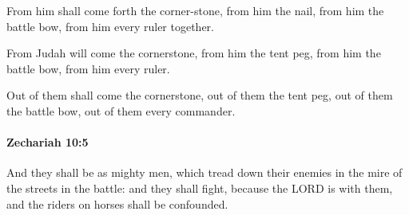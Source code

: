 			\begin{versebox}
					\item[BHS] 
					\item[LXX] 
					\item[ASV] From him shall come forth the corner-stone, from him the nail, from him the battle bow, from him every ruler together.
					\item[NIV] From Judah will come the cornerstone, from him the tent peg, from him the battle bow, from him every ruler.
					\item[NRSV] Out of them shall come the cornerstone, out of them the tent peg, out of them the battle bow, out of them every commander.
			\end{versebox}

		\paragraph{Zechariah 10:5} %
			\label{ZECHARIAH-10-5}

			And they shall be as mighty men, which tread down their enemies in the mire of the streets in the battle: and they shall fight, because the LORD is with them, and the riders on horses shall be confounded.

